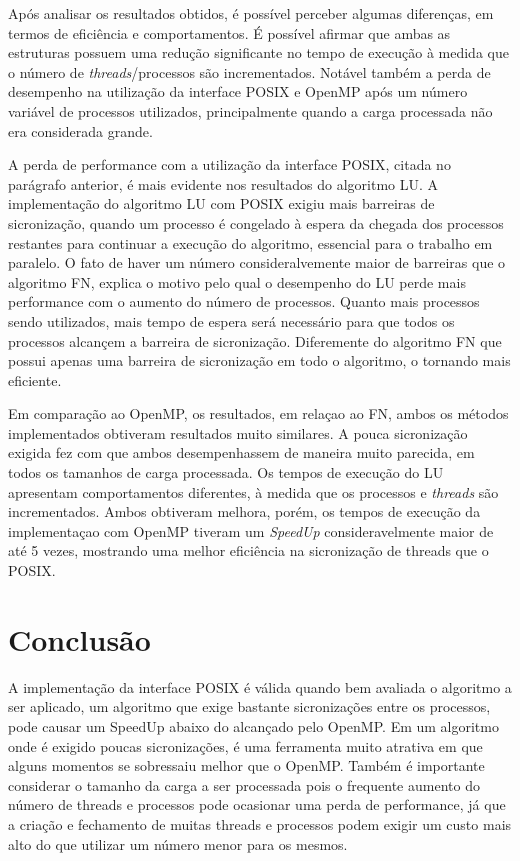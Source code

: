\documentclass[12pt]{article}
\begin{document}
Após analisar os resultados obtidos, é possível perceber algumas diferenças, em termos de eficiência e comportamentos. É possível afirmar que ambas as estruturas possuem uma redução significante no tempo de execução à medida que o número de \textit{threads}/processos são incrementados. Notável também a perda de desempenho na utilização da interface POSIX e OpenMP após um número variável de processos utilizados, principalmente quando a carga processada não era considerada grande. 

A perda de performance com a utilização da interface POSIX, citada no parágrafo anterior, é mais evidente nos resultados do algoritmo LU. A implementação do algoritmo LU com POSIX exigiu mais barreiras de sicronização, quando um processo é congelado à espera da chegada dos processos restantes para continuar a execução do algoritmo, essencial para o trabalho em paralelo. O fato de haver um número consideralvemente maior de barreiras que o algoritmo FN, explica o motivo pelo qual o desempenho do LU perde mais performance com o aumento do número de processos. Quanto mais processos sendo utilizados, mais tempo de espera será necessário para que todos os processos alcançem a barreira de sicronização. Diferemente do algoritmo FN que possui apenas uma barreira de sicronização em todo o algoritmo, o tornando mais eficiente. 

Em comparação ao OpenMP, os resultados, em relaçao ao FN, ambos os métodos implementados obtiveram resultados muito similares. A pouca sicronização exigida fez com que ambos desempenhassem de maneira muito parecida, em todos os tamanhos de carga processada. Os tempos de execução do LU apresentam comportamentos diferentes, à medida que os processos e \textit{threads} são incrementados. Ambos obtiveram melhora, porém, os tempos de execução da implementaçao com OpenMP tiveram um \textit{SpeedUp} consideravelmente maior de até 5 vezes, mostrando uma melhor eficiência na sicronização de threads que o POSIX. 

\section{Conclusão}

A implementação da interface POSIX é válida quando bem avaliada o algoritmo a ser aplicado, um algoritmo que exige bastante sicronizações entre os processos, pode causar um SpeedUp abaixo do alcançado pelo OpenMP. Em um algoritmo onde é exigido poucas sicronizações, é uma ferramenta muito atrativa em que alguns momentos se sobressaiu melhor que o OpenMP. Também é importante considerar o tamanho da carga a ser processada pois o frequente aumento do número de threads e processos pode ocasionar uma perda de performance, já que a criação e fechamento de muitas threads e processos podem exigir um custo mais alto do que utilizar um número menor para os mesmos. 


\nocite{*}






\end{document}
